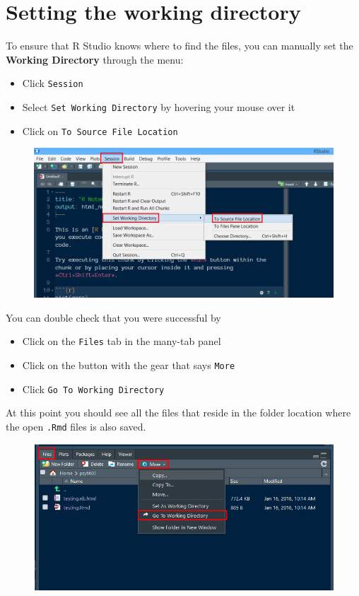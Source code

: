 \documentclass[]{book}
\providecommand{\tightlist}{%
  \setlength{\itemsep}{0pt}\setlength{\parskip}{0pt}}
\theoremstyle{definition}
\theoremstyle{definition}
\theoremstyle{definition}
\theoremstyle{remark}
\begin{document}
\section{Setting the working
directory}\label{setting-the-working-directory}

To ensure that R Studio knows where to find the files, you can manually
set the \textbf{Working Directory} through the menu:

\begin{itemize}
\tightlist
\item
  Click \texttt{Session}
\item
  Select \texttt{Set\ Working\ Directory} by hovering your mouse over it
\item
  Click on \texttt{To\ Source\ File\ Location}
\end{itemize}

\begin{figure}
\centering
\includegraphics{img/Set_wd_source.png}
\caption{}
\end{figure}

You can double check that you were successful by

\begin{itemize}
\tightlist
\item
  Click on the \texttt{Files} tab in the many-tab panel
\item
  Click on the button with the gear that says \texttt{More}
\item
  Click \texttt{Go\ To\ Working\ Directory}
\end{itemize}

At this point you should see all the files that reside in the folder
location where the open \texttt{.Rmd} files is also saved.

\begin{figure}
\centering
\includegraphics{img/files_goto_wd.png}
\caption{}
\end{figure}
\end{document}
